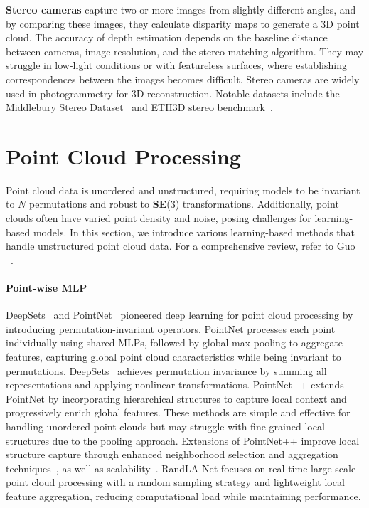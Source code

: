 \noindent
\textbf{Stereo cameras} capture two or more images from slightly different angles, and by comparing these images, they calculate disparity maps to generate a 3D point cloud. The accuracy of depth estimation depends on the baseline distance between cameras, image resolution, and the stereo matching algorithm. They may struggle in low-light conditions or with featureless surfaces, where establishing correspondences between the images becomes difficult. Stereo cameras are widely used in photogrammetry for 3D reconstruction. Notable datasets include the Middlebury Stereo Dataset~\cite{scharstein2002taxonomy} and ETH3D stereo benchmark~\cite{schops2017multi}.

\section{Point Cloud Processing}
\label{sec:bg_pc_process}
Point cloud data is unordered and unstructured, requiring models to be invariant to $N\!$ permutations and robust to \textbf{SE}(3) transformations. Additionally, point clouds often have varied point density and noise, posing challenges for learning-based models. In this section, we introduce various learning-based methods that handle unstructured point cloud data. For a comprehensive review, refer to Guo \etal~\cite{guo2020deep}.

\paragraph{Point-wise MLP}
DeepSets~\cite{zaheer2017deep} and PointNet~\cite{qi2017pointnet} pioneered deep learning for point cloud processing by introducing permutation-invariant operators. PointNet processes each point individually using shared MLPs, followed by global max pooling to aggregate features, capturing global point cloud characteristics while being invariant to permutations. DeepSets~\cite{zaheer2017deep} achieves permutation invariance by summing all representations and applying nonlinear transformations. PointNet++\cite{qi2017pointnet++} extends PointNet by incorporating hierarchical structures to capture local context and progressively enrich global features. These methods are simple and effective for handling unordered point clouds but may struggle with fine-grained local structures due to the pooling approach. Extensions of PointNet++ improve local structure capture through enhanced neighborhood selection and aggregation techniques~\cite{wang2019dynamic}, as well as scalability~\cite{NEURIPS2022_9318763d}. RandLA-Net\cite{hu2020randla} focuses on real-time large-scale point cloud processing with a random sampling strategy and lightweight local feature aggregation, reducing computational load while maintaining performance.

